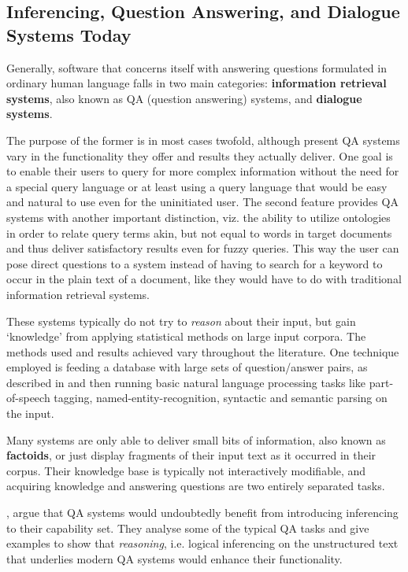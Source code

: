 \documentclass[notitlepage,twoside,a4paper]{scrreprt}
\newcommand{\abbr}{\textsf} %
\newcommand{\term}[1]{\textsf{\textbf{#1}}} %
\theoremstyle{remark}
\theoremstyle{remark}
\theoremstyle{definition}
\theoremstyle{definition}
\begin{document}
\subsection{Inferencing, Question Answering, and Dialogue Systems Today}\label{sec:comparison}

Generally, software that concerns itself with answering questions formulated in
ordinary human language falls in two main categories: \term{information
retrieval systems}, also known as \abbr{QA} (question answering) systems, and
\term{dialogue systems}.

The purpose of the former is in most cases twofold, although present \abbr{QA}
systems vary in the functionality they offer and results they actually deliver.
One goal is to enable their users to query for more complex information without
the need for a special query language or at least using a query language that
would be easy and natural to use even for the uninitiated user. The second
feature provides \abbr{QA} systems with another important distinction, viz. the
ability to utilize ontologies in order to relate query terms akin, but not equal
to words in target documents and thus deliver satisfactory results even for
fuzzy queries. This way the user can pose direct questions to a system instead
of having to search for a keyword to occur in the plain text of a document, like
they would have to do with traditional information retrieval systems. 

These systems typically do not try to \emph{reason} about
their input, but gain `knowledge' from applying statistical methods on large
input corpora. The methods used and results achieved vary throughout the
literature. One technique employed is feeding a database with large sets of
question/answer pairs, as described in \cite{rama} and then running basic
natural language processing tasks like part-of-speech tagging,
named-entity-recognition, syntactic and semantic parsing on the input.

Many systems are only able to deliver small bits of information, also known as
\term{factoids}, or just display fragments of their input text as it occurred in
their corpus. Their knowledge base is typically not interactively modifiable,
and acquiring knowledge and answering questions are two entirely separated
tasks.

\cite{webber}, argue that \abbr{QA} systems would undoubtedly benefit from
introducing inferencing to their capability set. They analyse some of the
typical \abbr{QA} tasks and give examples to show that \emph{reasoning},
i.e. logical inferencing on the unstructured text that underlies modern
\abbr{QA} systems would enhance their functionality.
\end{document}
